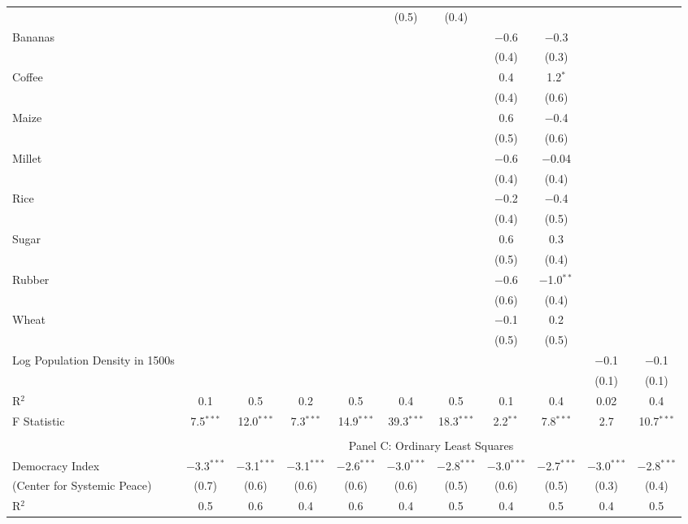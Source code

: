 \begin{table}[!htbp]
\begin{threeparttable}
\begin{tabular}{@{\extracolsep{0pt}}lcccccccccc}
  &  &  &  &  & (0.5) & (0.4) &  &  &  &  \\ 
  Bananas &  &  &  &  &  &  & $-$0.6 & $-$0.3 &  &  \\ 
  &  &  &  &  &  &  & (0.4) & (0.3) &  &  \\ 
  Coffee &  &  &  &  &  &  & 0.4 & 1.2$^{*}$ &  &  \\ 
  &  &  &  &  &  &  & (0.4) & (0.6) &  &  \\ 
  Maize &  &  &  &  &  &  & 0.6 & $-$0.4 &  &  \\ 
  &  &  &  &  &  &  & (0.5) & (0.6) &  &  \\ 
  Millet &  &  &  &  &  &  & $-$0.6 & $-$0.04 &  &  \\ 
  &  &  &  &  &  &  & (0.4) & (0.4) &  &  \\ 
  Rice &  &  &  &  &  &  & $-$0.2 & $-$0.4 &  &  \\ 
  &  &  &  &  &  &  & (0.4) & (0.5) &  &  \\ 
  Sugar &  &  &  &  &  &  & 0.6 & 0.3 &  &  \\ 
  &  &  &  &  &  &  & (0.5) & (0.4) &  &  \\ 
  Rubber &  &  &  &  &  &  & $-$0.6 & $-$1.0$^{**}$ &  &  \\ 
  &  &  &  &  &  &  & (0.6) & (0.4) &  &  \\ 
  Wheat &  &  &  &  &  &  & $-$0.1 & 0.2 &  &  \\ 
  &  &  &  &  &  &  & (0.5) & (0.5) &  &  \\ 
  Log Population Density in 1500s &  &  &  &  &  &  &  &  & $-$0.1 & $-$0.1 \\ 
  &  &  &  &  &  &  &  &  & (0.1) & (0.1) \\ 
 R$^{2}$ & 0.1 & 0.5 & 0.2 & 0.5 & 0.4 & 0.5 & 0.1 & 0.4 & 0.02 & 0.4 \\ 
F Statistic & 7.5$^{***}$  & 12.0$^{***}$  & 7.3$^{***}$ & 14.9$^{***}$  & 39.3$^{***}$ & 18.3$^{***}$  & 2.2$^{**}$  & 7.8$^{***}$  & 2.7  & 10.7$^{***}$\\ 
\hline  \\[-1.8ex] 
   & \multicolumn{10}{c}{Panel C: Ordinary Least Squares} \\
Democracy Index & $-$3.3$^{***}$ & $-$3.1$^{***}$ & $-$3.1$^{***}$ & $-$2.6$^{***}$ & $-$3.0$^{***}$ & $-$2.8$^{***}$ & $-$3.0$^{***}$ & $-$2.7$^{***}$ & $-$3.0$^{***}$ & $-$2.8$^{***}$ \\ 
(Center for Systemic Peace) & (0.7) & (0.6) & (0.6) & (0.6) & (0.6) & (0.5) & (0.6) & (0.5) & (0.3) & (0.4) \\ 
R$^{2}$ & 0.5 & 0.6 & 0.4 & 0.6 & 0.4 & 0.5 & 0.4 & 0.5 & 0.4 & 0.5 \\ 

\end{tabular}
\end{threeparttable}
\end{table}

